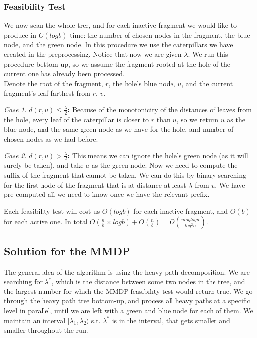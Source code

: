 \documentclass[11pt,a4paper]{article}
\theoremstyle{definition}
\theoremstyle{remark}
\newtheorem{case}{Case}
\begin{document}
\subsubsection{Feasibility Test}
We now scan the whole tree, and for each inactive fragment we would like to produce in $O(logb)$ time: the number of chosen nodes in the fragment, the blue node, and the green node. In this procedure we use the caterpillars we have created in the preprocessing. Notice that now we are given $\lambda$.
We run this procedure bottom-up, so we assume the fragment rooted at the hole of the current one has already been processed.\\
Denote the root of the fragment, $r$, the hole's blue node, $u$, and the current fragment's leaf farthest from $r$, $v$.\\
\begin{case}
\textbf{$d(r,u)\leq \frac{\lambda}{2}$:} Because of the monotonicity of the distances of leaves from the hole, every leaf of the caterpillar is closer to $r$ than $u$, so we return $u$ as the blue node, and the same green node as we have for the hole, and number of chosen nodes as we had before.
\end{case}
\begin{case}
\textbf{$d(r,u) > \frac{\lambda}{2}$:}
This means we can ignore the hole's green node (as it will surely be taken), and take $u$ as the green node. Now we need to compute the suffix of the fragment that cannot be taken. We can do this by binary searching for the first node of the fragment that is at distance at least $\lambda$ from $u$. We have pre-computed all we need to know once we have the relevant prefix.
\end{case}
Each feasibility test will cost us $O(logb)$ for each inactive fragment, and $O(b)$ for each active one. In total $O(\frac{n}{b} \times logb) + O(\frac{n}{b}) = O(\frac{nloglogn}{log^2n})$.


\subsection{Solution for the MMDP}
The general idea of the algorithm is using the heavy path decomposition. We are searching for $\lambda^*$, which is the distance between some two nodes in the tree, and the largest number for which the MMDP feasibility test would return true.
We go through the heavy path tree bottom-up, and process all heavy paths at a specific level in parallel, until we are left with a green and blue node for each of them. We maintain an interval $[\lambda_1,\lambda_2)$ s.t. $\lambda^*$ is in the interval, that gets smaller and smaller throughout the run.
\end{document}
